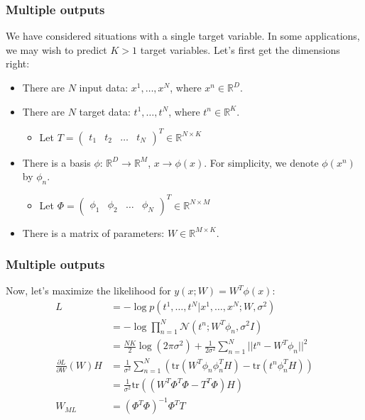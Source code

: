 \documentclass{beamer}
\begin{document}
\begin{frame}
    \frametitle{Multiple outputs}
    We have considered situations with a single target variable. In some applications, we may wish to predict $K>1$ target variables. Let's first get the dimensions right:
    \begin{itemize}
        \item There are $N$ input data: $x^{1},\hdots,x^{N}$, where $x^{n}\in\mathbb{R}^{D}$.
        \item There are $N$ target data: $t^{1},\hdots,t^{N}$, where $t^{n}\in\mathbb{R}^{K}$.
        \begin{itemize}
            \item Let $T=\begin{pmatrix}
                t_{1}&t_{2}&\hdots&t_{N}
            \end{pmatrix}^{T}\in\mathbb{R}^{N\times{}K}$
        \end{itemize}
        \item There is a basis $\phi$: $\mathbb{R}^{D}\to\mathbb{R}^{M}$, $x\to\phi(x)$. For simplicity, we denote $\phi(x^{n})$ by $\phi_{n}$.
        \begin{itemize}
            \item Let $\Phi=\begin{pmatrix}
                \phi_{1}&\phi_{2}&\hdots&\phi_{N}
            \end{pmatrix}^{T}\in\mathbb{R}^{N\times{}M}$
        \end{itemize}
        \item There is a matrix of parameters: $W\in\mathbb{R}^{M\times{}K}$.
    \end{itemize}
\end{frame}

\begin{frame}
    \frametitle{Multiple outputs}
    Now, let's maximize the likelihood for $y(x;W)=W^{T}\phi(x)$:
    \begin{align*}
        L&=-\log{}p(t^{1},\hdots,t^{N}|x^{1},\hdots,x^{N};W,\sigma^{2}) \\
        &=-\log\prod_{n=1}^{N}\mathcal{N}(t^{n};W^{T}\phi_{n},\sigma^{2}I) \\
        &=\frac{NK}{2}\log(2\pi\sigma^{2})+\frac{1}{2\sigma^{2}}\sum_{n=1}^{N}||t^{n}-W^{T}\phi_{n}||^{2} \\
        \frac{\partial{}L}{\partial{}W}(W)H&=\frac{1}{\sigma^{2}}\sum_{n=1}^{N}(\mathrm{tr}(W^{T}\phi_{n}\phi_{n}^{T}H)-\mathrm{tr}(t^{n}\phi_{n}^{T}H)) \\
        &=\frac{1}{\sigma^{2}}\mathrm{tr}((W^{T}\Phi^{T}\Phi-T^{T}\Phi)H) \\
        W_{ML}&=(\Phi^{T}\Phi)^{-1}\Phi^{T}T
    \end{align*}
\end{frame}
\end{document}
